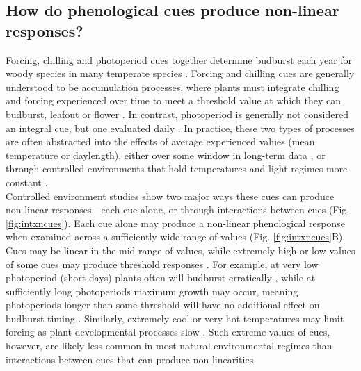 \documentclass[11pt,letter]{article}
\begin{document}
\subsection{How do phenological cues produce non-linear responses?}
Forcing, chilling and photoperiod cues together determine budburst each year for woody species in many temperate species \citep[e.g.,][]{chuinearees,ettinger2020}. Forcing and chilling cues are generally understood to be accumulation processes, where plants must integrate chilling and forcing experienced over time to meet a threshold value at which they can budburst, leafout or flower \citep{Chuine2000}. In contrast, photoperiod is generally not considered an integral cue, but one evaluated daily \citep{Singh:2017}. In practice, these two types of processes are often abstracted into the effects of average experienced values (mean temperature or daylength), either over some window in long-term data \citep[e.g.,][]{Wolkovich:2012n,fu2015}, or through controlled environments that hold temperatures and light regimes more constant \citep[e.g.,][]{Worrall:1967aa,Heide:1993,Heide:1993a,Skuterud:1994aa}. \\

Controlled environment studies show two major ways these cues can produce non-linear responses---each cue alone, or through interactions between cues (Fig. \ref{fig:intxncues}). Each cue alone may produce a non-linear phenological response when examined across a sufficiently wide range of values (Fig. \ref{fig:intxncues}B). Cues may be linear in the mid-range of values, while extremely high or low values of some cues may produce threshold responses \citep{gauzere2017}. For example, at very low photoperiod (short days) plants often will budburst erratically \citep{Heide:1993,Partanen:1998aa,Singh:2017,rinne2018}, while at sufficiently long photoperiods maximum growth may occur, meaning photoperiods longer than some threshold will have no additional effect on budburst timing \citep[e.g.,][]{major1980}. Similarly, extremely cool or very hot temperatures may limit forcing as plant developmental processes slow \citep{parent2012}. Such extreme values of cues, however, are likely less common in most natural environmental regimes than interactions between cues that can produce non-linearities.\\
\end{document}
